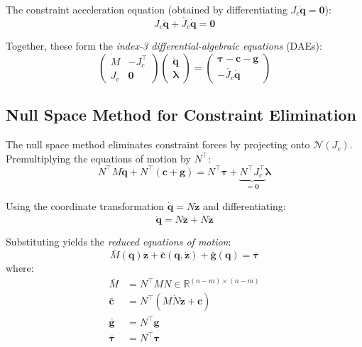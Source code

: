 \documentclass[11pt,a4paper]{article}
\theoremstyle{definition}
\newcommand{\R}{\mathbb{R}}
\newcommand{\nullspace}{\mathcal{N}}
\newcommand{\Jc}{J_c}
\newcommand{\qvec}{\bm{q}}
\newcommand{\gvec}{\bm{g}}
\newcommand{\cvec}{\bm{c}}
\newcommand{\lambdavec}{\bm{\lambda}}
\newcommand{\tauvec}{\bm{\tau}}
\begin{document}
The constraint acceleration equation (obtained by differentiating $\Jc \dot{\qvec} = \bm{0}$):
\begin{equation}
    \Jc \ddot{\qvec} + \dot{\Jc} \dot{\qvec} = \bm{0}
\end{equation}

Together, these form the \emph{index-3 differential-algebraic equations} (DAEs):
\begin{equation}
    \begin{pmatrix} M & -\Jc^\top \\ \Jc & \bm{0} \end{pmatrix}
    \begin{pmatrix} \ddot{\qvec} \\ \lambdavec \end{pmatrix}
    = \begin{pmatrix} \tauvec - \cvec - \gvec \\ -\dot{\Jc}\dot{\qvec} \end{pmatrix}
\end{equation}

\subsection{Null Space Method for Constraint Elimination}

The null space method eliminates constraint forces by projecting onto $\nullspace(\Jc)$. Premultiplying the equations of motion by $N^\top$:
\begin{equation}
    N^\top M \ddot{\qvec} + N^\top (\cvec + \gvec) = N^\top \tauvec + \underbrace{N^\top \Jc^\top}_{= \bm{0}} \lambdavec
\end{equation}

Using the coordinate transformation $\dot{\qvec} = N \dot{\bm{z}}$ and differentiating:
\begin{equation}
    \ddot{\qvec} = N \ddot{\bm{z}} + \dot{N} \dot{\bm{z}}
\end{equation}

Substituting yields the \emph{reduced equations of motion}:
\begin{equation}
    \boxed{\bar{M}(\qvec) \ddot{\bm{z}} + \bar{\cvec}(\qvec, \dot{\bm{z}}) + \bar{\gvec}(\qvec) = \bar{\tauvec}}
\end{equation}
where:
\begin{align}
    \bar{M} &= N^\top M N \in \R^{(n-m) \times (n-m)} \\
    \bar{\cvec} &= N^\top (M \dot{N} \dot{\bm{z}} + \cvec) \\
    \bar{\gvec} &= N^\top \gvec \\
    \bar{\tauvec} &= N^\top \tauvec
\end{align}
\end{document}
